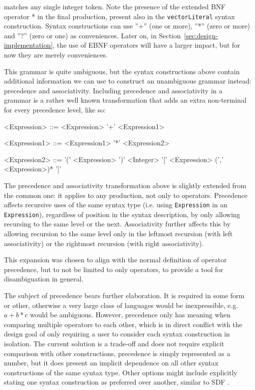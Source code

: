 \documentclass{kththesis}
\begin{document}
 matches any single integer token. Note the presence of the extended BNF operator * in the final production, present also in the \texttt{vectorLiteral} syntax construction. Syntax constructions can use ''+'' (one or more), ''*'' (zero or more) and ''?'' (zero or one) as conveniences. Later on, in Section~\ref{sec:design-implementation}, the use of EBNF operators will have a larger impact, but for now they are merely conveniences.

This grammar is quite ambiguous, but the syntax constructions above contain additional information we can use to construct an unambiguous grammar instead: precedence and associativity. Including precedence and associativity in a grammar is a rather well known transformation that adds an extra non-terminal for every precedence level, like so:

\setlength{\grammarindent}{8em}
\begin{grammar}
<Expression> ::= <Expression> '+' <Expression1>

<Expression1> ::= <Expression1> '*' <Expression2>

<Expression2> ::= '(' <Expression> ')'
  \alt <Integer>
  \alt '[' <Expression> (',' <Expression>)* ']'
\end{grammar}

The precedence and associativity transformation above is slightly extended from the common one: it applies to any production, not only to operators. Precedence affects recursive uses of the same syntax type (i.e. using \texttt{Expression} in an \texttt{Expression}), regardless of position in the syntax description, by only allowing recursing to the same level or the next. Associativity further affects this by allowing recursion to the same level only in the leftmost recursion (with left associativity) or the rightmost recursion (with right associativity).

This expansion was chosen to align with the normal definition of operator precedence, but to not be limited to only operators, to provide a tool for disambiguation in general.

The subject of precedence bears further elaboration. It is required in some form or other, otherwise a very large class of languages would be inexpressible, e.g. $a + b * c$ would be ambiguous. However, precedence only has meaning when comparing multiple operators to each other, which is in direct conflict with the design goal of only requiring a user to consider each syntax construction in isolation. The current solution is a trade-off and does not require explicit comparison with other constructions, precedence is simply represented as a number, but it does present an implicit dependence on all other syntax constructions of the same syntax type. Other options might include explicitly stating one syntax construction as preferred over another, similar to SDF \cite{Heering1989The-syntax-defi}.
\end{document}
